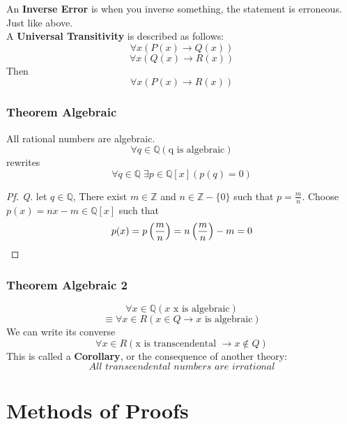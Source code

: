 \documentclass[12pt]{book}
\newcommand{\Z}{\mathbb{Z}}
\newcommand{\Q}{\mathbb{Q}}
\newcommand{\paren}[1]{\left( #1 \right)}
\begin{document}
An \textbf{Inverse Error} is when you inverse something, the statement is erroneous. Just like above. \\

A \textbf{Universal Transitivity} is described as follows:
\[
\forall x \paren{ P(x) \rightarrow Q(x)}
\]
\[
\forall x \paren{ Q(x) \rightarrow R(x)}
\]
Then
\[
\forall x \paren{ P(x) \rightarrow R(x)}
\]

\subsubsection{Theorem Algebraic}
All rational numbers are algebraic.
\[
\forall q \in \Q \paren{\text{q is algebraic}}
\]
rewrites
\[
\forall q \in \Q \; \exists p \in \Q [x] \paren{p(q)=0}
\]
\begin{proof}[Pf. Q]
    let $q \in \Q$, There exist $m \in \Z$ and $n \in \Z - \{0\} $ such that $p = \frac{m}{n}$. Choose $p(x) = nx - m \in \Q [x]$ such that 
    \[
    p(x) = p\paren{\frac{m}{n}} = \\
    n\paren{\frac{m}{n}}-m = 0
    \]
\end{proof}

\subsubsection{Theorem Algebraic 2}
\[
\forall x \in \Q \paren{x \text{ x is algebraic}}
\]
\[
\equiv \forall x \in R \paren{x \in Q \rightarrow x \text{ is algebraic}}
\]
We can write its converse
\[
\forall x \in R \paren{\text{x is transcendental } \rightarrow x \notin Q}
\]
This is called a \textbf{Corollary}, or the consequence of another theory:\\
\[
\textit{All transcendental numbers are irrational}
\]

\newpage
\section{Methods of Proofs}
\end{document}
